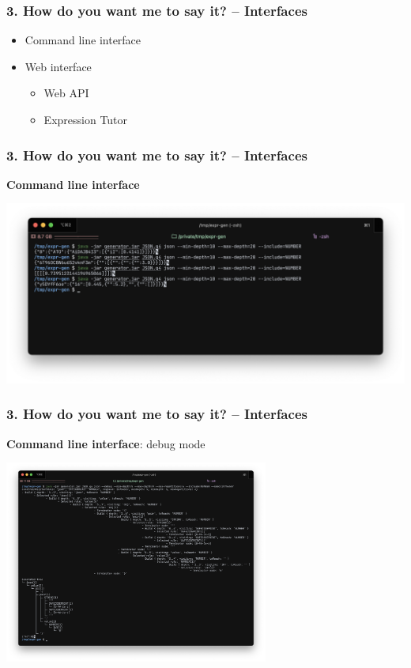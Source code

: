 \documentclass[t,aspectratio=32]{beamer}
\begin{document}

\begin{frame}
\frametitle{3. How do you want me to say it? – Interfaces}

\begin{itemize}
\item Command line interface
\item Web interface
    \begin{itemize}
    \item Web API
    \item Expression Tutor
    \end{itemize}
\end{itemize}
\end{frame}

\begin{frame}
\frametitle{3. How do you want me to say it? – Interfaces}

\textbf{Command line interface}

\includegraphics[width=\textwidth]{img/cli_show.png}
\end{frame}

\begin{frame}
\frametitle{3. How do you want me to say it? – Interfaces}

\textbf{Command line interface}: debug mode

\begin{center}
\includegraphics[height=18em]{img/cli_debug.png}
\end{center}
\end{frame}
\end{document}
